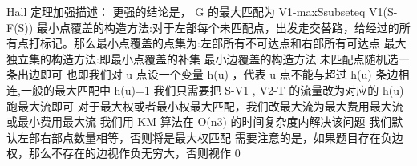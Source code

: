{}\markdownRendererDollarSign{} Hall \markdownRendererDollarSign{}定理加强描述：\markdownRendererParagraphSeparator
{}更强的结论是，\markdownRendererDollarSign{} G \markdownRendererDollarSign{}的最大匹配为\markdownRendererDollarSign{} \markdownRendererPipe{}V1\markdownRendererPipe{}-max\markdownRendererUnderscore{}\markdownRendererLeftBrace{}S\markdownRendererBackslash{}subseteq V1\markdownRendererRightBrace{}(\markdownRendererPipe{}S\markdownRendererPipe{}-\markdownRendererPipe{}F(S)\markdownRendererPipe{}) \markdownRendererDollarSign{}\markdownRendererParagraphSeparator
{}最小点覆盖的构造方法:对于左部每个未匹配点，出发走交替路，给经过的所有点打标记。那么最小点覆盖的点集为:左部所有不可达点和右部所有可达点\markdownRendererParagraphSeparator
{}最大独立集的构造方法:即最小点覆盖的补集\markdownRendererParagraphSeparator
{}最小边覆盖的构造方法:未匹配点随机选一条出边即可\markdownRendererInterblockSeparator
{}
\markdownRendererSectionEnd \markdownRendererSectionBegin
{}\markdownRendererInterblockSeparator
{}也即我们对\markdownRendererDollarSign{} u \markdownRendererDollarSign{}点设一个变量\markdownRendererDollarSign{} h(u) \markdownRendererDollarSign{}，代表\markdownRendererDollarSign{} u \markdownRendererDollarSign{}点不能与超过\markdownRendererDollarSign{} h(u) \markdownRendererDollarSign{}条边相连,一般的最大匹配中\markdownRendererDollarSign{} h(u)=1 \markdownRendererDollarSign{}\markdownRendererParagraphSeparator
{}我们只需要把\markdownRendererDollarSign{} S-V1 \markdownRendererDollarSign{},\markdownRendererDollarSign{} V2-T\markdownRendererSoftLineBreak
{}\markdownRendererDollarSign{}的流量改为对应的\markdownRendererDollarSign{} h(u) \markdownRendererDollarSign{}跑最大流即可\markdownRendererInterblockSeparator
{}
\markdownRendererSectionEnd \markdownRendererSectionBegin
{}\markdownRendererInterblockSeparator
{}对于最大权或者最小权最大匹配，我们改最大流为最大费用最大流或最小费用最大流\markdownRendererInterblockSeparator
{}
\markdownRendererSectionEnd \markdownRendererSectionBegin
{}\markdownRendererInterblockSeparator
{}我们用\markdownRendererDollarSign{} KM \markdownRendererDollarSign{}算法在\markdownRendererDollarSign{} O(n\markdownRendererCircumflex{}3) \markdownRendererDollarSign{}的时间复杂度内解决该问题\markdownRendererParagraphSeparator
{}我们默认左部右部点数量相等，否则将是最大权匹配\markdownRendererParagraphSeparator
{}需要注意的是，如果题目存在负边权，那么不存在的边视作负无穷大，否则视作\markdownRendererDollarSign{} 0 \markdownRendererDollarSign{}\markdownRendererParagraphSeparator
